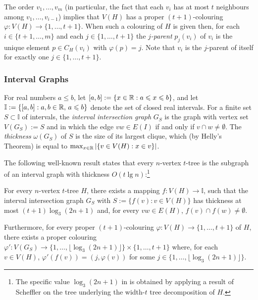 \documentclass[kpfonts]{patmorin}
\let\le\leqslant
\begin{document}
The order $v_1,\ldots,v_m$ (in particular, the fact that each $v_i$ has at most $t$ neighbours among $v_1,\ldots,v_{i-1}$) implies that $V(H)$ has a proper $(t+1)$-colouring $\varphi:V(H)\to\{1,\ldots,t+1\}$.  When such a colouring of $H$ is given then, for each $i\in\{t+1,\ldots,m\}$ and each $j\in\{1,\ldots,t+1\}$ the \emph{$j$-parent} $p_j(v_i)$ of $v_i$ is the unique element $p\in C_H(v_i)$ with $\varphi(p)=j$.  Note that $v_i$ is the $j$-parent of itself for exactly one $j\in\{1,\ldots,t+1\}$.

\subsubsection{Interval Graphs}

For real numbers $a\le b$, let $[a,b]:=\{ x\in\R: a\le x\le b\}$, and let
$\mathbb{I}:=\{[a,b]: a,b\in\R,\, a\le b\}$ denote the set of closed real intervals.  For a finite set $S\subset\mathbb{I}$ of intervals, the \emph{interval intersection graph} $G_S$ is the graph with vertex set $V(G_S):=S$ and in which the edge $vw\in E(I)$ if and only if $v\cap w\neq \emptyset$.  The \emph{thickness} $\omega(G_S)$ of $S$ is the size of its largest clique, which (by Helly's Theorem) is equal to $\max_{x\in\mathbb{R}}|\{v\in V(H):x\in v\}|$.  


The following well-known result states that every $n$-vertex $t$-tree is the subgraph of an interval graph with thickness $O(t\lg n)$:\footnote{The specific value $\log_3 (2n+1)$ in  is obtained by applying a result of Scheffler \cite{scheffler:optimal} on the tree underlying the width-$t$ tree decomposition of $H$.}

\begin{lem}
  For every $n$-vertex $t$-tree $H$, there exists a mapping $f:V(H)\to\mathbb{I}$, such that the interval intersection graph $G_S$ with $S:=\{f(v):v\in V(H)\}$ has thickness at most $(t+1)\log_3(2n+1)$ and, for every $vw\in E(H)$, $f(v)\cap f(w)\neq\emptyset$.  
  
  Furthermore, for every proper $(t+1)$-colouring $\varphi:V(H)\to\{1,\ldots,t+1\}$ of $H$, there exists a proper colouring $\varphi':V(G_S)\to\{1,\ldots,\lfloor\log_3(2n+1)\rfloor\}\times\{1,\ldots,t+1\}$ where, for each $v\in V(H)$, $\varphi'(f(v))=(j,\varphi(v))$ for some $j\in\{1,\ldots,\lfloor\log_3(2n+1)\rfloor\}$.
\end{lem}
\end{document}
